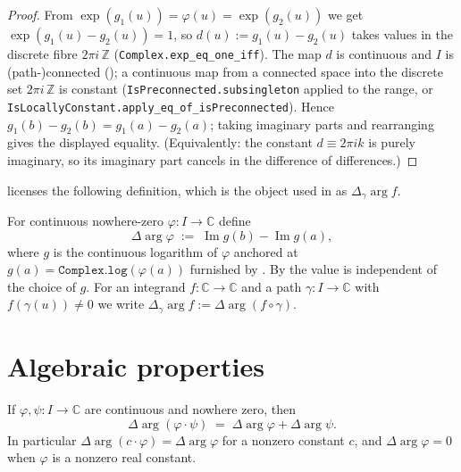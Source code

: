 \begin{proof}
\leanok
{}
From $\exp(g_1(u))=\varphi(u)=\exp(g_2(u))$ we get
$\exp(g_1(u)-g_2(u))=1$, so $d(u):=g_1(u)-g_2(u)$ takes values in the discrete
fibre $2\pi i\,\mathbb{Z}$ (\texttt{Complex.exp\_eq\_one\_iff}). The map $d$ is
continuous and $I$ is (path-)connected (); a continuous map
from a connected space into the discrete set $2\pi i\,\mathbb{Z}$ is constant
(\texttt{IsPreconnected.subsingleton} applied to the range, or
\texttt{IsLocallyConstant.apply\_eq\_of\_isPreconnected}). Hence
$g_1(b)-g_2(b)=g_1(a)-g_2(a)$; taking imaginary parts and rearranging gives the
displayed equality. (Equivalently: the constant $d\equiv 2\pi i k$ is purely
imaginary, so its imaginary part cancels in the difference of differences.)
\end{proof}

 licenses the following definition, which is the object used in
 as $\Delta_\gamma\arg f$.

\begin{definition}
\label{def:av_argVariation}
\leanok
{}
For continuous nowhere-zero $\varphi:I\to\mathbb{C}$ define
\[
  \Delta\arg\varphi \;:=\; \operatorname{Im} g(b) - \operatorname{Im} g(a),
\]
where $g$ is the continuous logarithm of $\varphi$ anchored at
$g(a)=\texttt{Complex.log}(\varphi(a))$ furnished by . By
 the value is independent of the choice of $g$. For an
integrand $f:\mathbb{C}\to\mathbb{C}$ and a path $\gamma:I\to\mathbb{C}$ with
$f(\gamma(u))\neq0$ we write $\Delta_\gamma\arg f := \Delta\arg(f\circ\gamma)$.
\end{definition}

\section{Algebraic properties}
\label{sec:av_algebra}

\begin{lemma}
\label{lem:av_mul}
\leanok
{}
If $\varphi,\psi:I\to\mathbb{C}$ are continuous and nowhere zero, then
\[
  \Delta\arg(\varphi\cdot\psi) \;=\; \Delta\arg\varphi + \Delta\arg\psi .
\]
In particular $\Delta\arg(c\cdot\varphi)=\Delta\arg\varphi$ for a nonzero constant
$c$, and $\Delta\arg\varphi = 0$ when $\varphi$ is a nonzero real constant.
\end{lemma}

